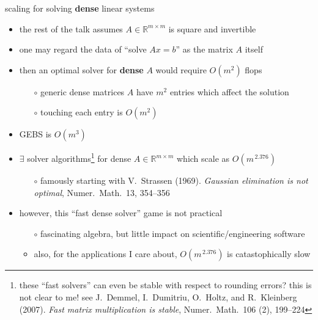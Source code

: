 \documentclass[10pt,
               svgnames,
               hyperref={colorlinks,citecolor=DeepPink4,linkcolor=FireBrick,urlcolor=Maroon},
               usepdftitle=false]{beamer}
\newcommand{\RR}{\mathbb{R}}
\begin{document}
\begin{frame}{scaling for solving \textbf{dense} linear systems}

\begin{itemize}
\item the rest of the talk assumes $A\in\RR^{m\times m}$ is square and invertible
\item one may regard the data of ``solve $Ax=b$'' as the matrix $A$ itself
\item then an optimal solver for \textbf{dense} $A$ would require $O(m^2)$ flops
   \begin{itemize}
   \item[$\circ$] generic dense matrices $A$ have $m^2$ entries which affect the solution
   \item[$\circ$] touching each entry is $O(m^2)$
   \end{itemize}
\item GEBS is $O(m^3)$
\item $\exists$ solver algorithms\footnote{these ``fast solvers'' can even be stable with respect to rounding errors? this is not clear to me! see J.~Demmel, I.~Dumitriu, O.~Holtz, and R.~Kleinberg (2007). \emph{Fast matrix multiplication is stable}, Numer.~Math.~106 (2), 199--224} for dense $A\in\RR^{m\times m}$ which scale as $O(m^{\,2.376})$
   \begin{itemize}
   \item[$\circ$] famously starting with V.~Strassen (1969). \emph{Gaussian elimination is not optimal}, Numer.~Math.~13, 354--356
   \end{itemize}
\item however, this ``fast dense solver'' game is not practical
   \begin{itemize}
   \item[$\circ$] fascinating algebra, but little impact on scientific/engineering software
   \item<2>[$\circ$] also, for the applications I care about, $O(m^{\,2.376})$ is catastophically slow
   \end{itemize}
\end{itemize}
\end{frame}
\end{document}
